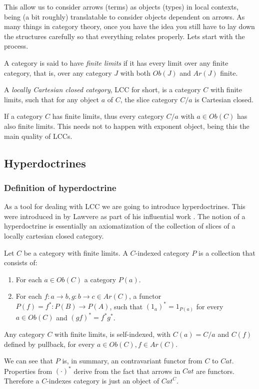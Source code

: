 This allow us to consider arrows (terms) as objects (types) in local contexts, being (a bit roughly) translatable to consider objects dependent on arrows.  As many things in category theory, once you have the idea you still have to lay down the structures carefully so that everything relates properly. Lets start with the process.

\begin{definition}
  A category is said to have \emph{finite limits} if it has every limit over any finite category, that is, over any category $J$ with both $Ob(J)$ and $Ar(J)$ finite.
\end{definition}

\begin{definition}
A \emph{locally Cartesian closed category}, LCC for short,  is a category $C$ with finite limits, such that for any object $a$ of $C$, the slice category $C/a $ is Cartesian closed.
\end{definition}

\begin{remark}
  If a category $C$ has finite limits, thus every category $C/a$ with $a\in Ob(C)$  has also finite limits. This needs not to happen with exponent object, being this the main quality of LCCs.
\end{remark}


\subsection{Hyperdoctrines}
\subsubsection{Definition of hyperdoctrine}
As a tool for dealing with LCC we are going to introduce hyperdoctrines. This were introduced in by Lawvere as part of his influential work \cite{lawvere1969adjointness}. The notion of a hyperdoctrine is essentially an axiomatization of the collection of slices of a locally cartesian closed category.

\begin{definition}
  Let $C$ be a category with finite limits. A $C$-indexed category $P$ is a collection that  consists of:
  \begin{enumerate}
  \item For each $a\in Ob(C)$  a category $P(a)$.
  \item For each $f:a\to b, g:b\to c\in Ar(C)$, a functor $P(f) = f^*:P(B) \to P(A)$, such that $(1_a)^* = 1_{P(a)}$ for every  $a \in Ob(C)$ and $(gf)^*= f^*g^*$.
  \end{enumerate}
\end{definition}
\begin{remark}
  Any category $C$ with finite limits, is self-indexed, with $C(a)=C/a$ and $C(f)$ defined by pullback, for every $a\in Ob(C), f\in Ar(C)$. 
\end{remark}
  We can see that $P$ is, in summary, an contravariant functor from $C$ to $Cat$. Properties from $(\cdot)^*$ derive from the fact that arrows in $Cat$ are functors. Therefore a $C$-indexes category is just an object of $Cat^C$.\\

